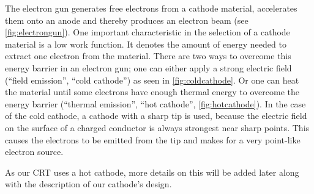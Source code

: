 The electron gun generates free electrons from a cathode material, accelerates them onto an anode and thereby produces an electron beam (see \cref{fig:electrongun}). One important characteristic in the selection of a cathode material is a low work function. It denotes the amount of energy needed to extract one electron from the material. There are two ways to overcome this energy barrier in an electron gun; one can either apply a strong electric field (``field emission'', ``cold cathode'')  as seen in \cref{fig:coldcathode}. Or one can heat the material until some electrons have enough thermal energy to overcome the energy barrier (``thermal emission'', ``hot cathode'', \cref{fig:hotcathode}).
In the case of the cold cathode, a cathode with a sharp tip is used, because  the electric field on the surface of a charged conductor is always strongest near sharp points. This causes the electrons to be emitted from the tip and makes for a very point-like electron source.

As our CRT uses a hot cathode, more details on this will be added later along with the description of our cathode's design.

